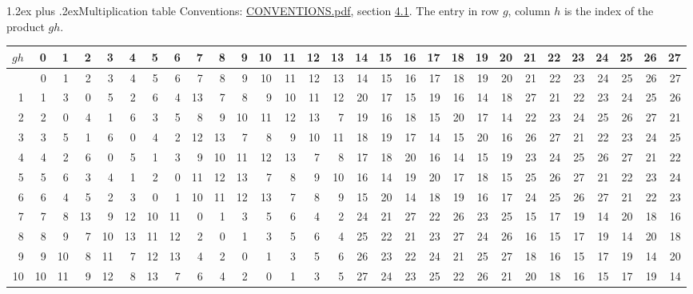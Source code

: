 \documentclass[10pt,a4paper]{article}
\makeatletter
\renewcommand\section{\@startsection{section}{1}{\z@}{-3ex plus -1ex minus -.2ex}%
  {1.2ex plus .2ex}{\normalfont\large\sffamily\bfseries\color{parttitle}}}
\numberwithin{equation}{section}
\makeatother
\begin{document}
\section{Multiplication table}\label{s:multiplication}
Conventions: \href{../../CONVENTIONS.pdf}{CONVENTIONS.pdf}, section \href{../../CONVENTIONS.pdf\#conv.4.1}{4.1}.
The entry in row $g$, column $h$ is the index of the product $gh$.
{\normalsize\setlength{\tabcolsep}{0.1em}\setlength{\LTleft}{-8pt plus 1fill}\setlength{\LTright}{-8pt plus 1fill}\begin{longtable}{@{}r|rrrrrrrrrrrrrrrrrrrrrrrrrrrr@{}}\toprule
$gh$ & 0 & 1 & 2 & 3 & 4 & 5 & 6 & 7 & 8 & 9 & 10 & 11 & 12 & 13 & 14 & 15 & 16 & 17 & 18 & 19 & 20 & 21 & 22 & 23 & 24 & 25 & 26 & 27\\\midrule\endhead
\bottomrule\endfoot\endlastfoot
0 & 0 & 1 & 2 & 3 & 4 & 5 & 6 & 7 & 8 & 9 & 10 & 11 & 12 & 13 & 14 & 15 & 16 & 17 & 18 & 19 & 20 & 21 & 22 & 23 & 24 & 25 & 26 & 27\\*
1 & 1 & 3 & 0 & 5 & 2 & 6 & 4 & 13 & 7 & 8 & 9 & 10 & 11 & 12 & 20 & 17 & 15 & 19 & 16 & 14 & 18 & 27 & 21 & 22 & 23 & 24 & 25 & 26\\
2 & 2 & 0 & 4 & 1 & 6 & 3 & 5 & 8 & 9 & 10 & 11 & 12 & 13 & 7 & 19 & 16 & 18 & 15 & 20 & 17 & 14 & 22 & 23 & 24 & 25 & 26 & 27 & 21\\
3 & 3 & 5 & 1 & 6 & 0 & 4 & 2 & 12 & 13 & 7 & 8 & 9 & 10 & 11 & 18 & 19 & 17 & 14 & 15 & 20 & 16 & 26 & 27 & 21 & 22 & 23 & 24 & 25\\
4 & 4 & 2 & 6 & 0 & 5 & 1 & 3 & 9 & 10 & 11 & 12 & 13 & 7 & 8 & 17 & 18 & 20 & 16 & 14 & 15 & 19 & 23 & 24 & 25 & 26 & 27 & 21 & 22\\
5 & 5 & 6 & 3 & 4 & 1 & 2 & 0 & 11 & 12 & 13 & 7 & 8 & 9 & 10 & 16 & 14 & 19 & 20 & 17 & 18 & 15 & 25 & 26 & 27 & 21 & 22 & 23 & 24\\
6 & 6 & 4 & 5 & 2 & 3 & 0 & 1 & 10 & 11 & 12 & 13 & 7 & 8 & 9 & 15 & 20 & 14 & 18 & 19 & 16 & 17 & 24 & 25 & 26 & 27 & 21 & 22 & 23\\
7 & 7 & 8 & 13 & 9 & 12 & 10 & 11 & 0 & 1 & 3 & 5 & 6 & 4 & 2 & 24 & 21 & 27 & 22 & 26 & 23 & 25 & 15 & 17 & 19 & 14 & 20 & 18 & 16\\
8 & 8 & 9 & 7 & 10 & 13 & 11 & 12 & 2 & 0 & 1 & 3 & 5 & 6 & 4 & 25 & 22 & 21 & 23 & 27 & 24 & 26 & 16 & 15 & 17 & 19 & 14 & 20 & 18\\
9 & 9 & 10 & 8 & 11 & 7 & 12 & 13 & 4 & 2 & 0 & 1 & 3 & 5 & 6 & 26 & 23 & 22 & 24 & 21 & 25 & 27 & 18 & 16 & 15 & 17 & 19 & 14 & 20\\
10 & 10 & 11 & 9 & 12 & 8 & 13 & 7 & 6 & 4 & 2 & 0 & 1 & 3 & 5 & 27 & 24 & 23 & 25 & 22 & 26 & 21 & 20 & 18 & 16 & 15 & 17 & 19 & 14\\

\end{longtable}}
\end{document}
